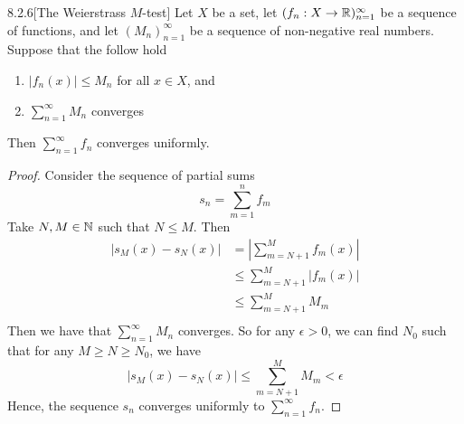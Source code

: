 \documentclass[openany]{report}
\begin{document}
\begin{manualtheorem}{8.2.6}[The Weierstrass $M$-test]
    Let $X$ be a set, let $(f_n: X \rightarrow \mathbb{R})_{n=1}^\infty$ be a sequence of functions, and let $(M_n)_{n=1}^\infty$ be a sequence of non-negative real numbers. Suppose that the follow hold
    \begin{enumerate}[label=(\roman*)]
        \item $|f_n(x)| \leq M_n$ for all $x \in X$, and 
        \item $\sum\limits_{n=1}^\infty M_n$ converges 
    \end{enumerate}
    Then $\sum\limits_{n=1}^\infty f_n$ converges uniformly. 
\end{manualtheorem}

\begin{proof}
    Consider the sequence of partial sums 
    \[s_n = \sum_{m=1}^n f_m\]
    Take $N, M \in \mathbb{N}$ such that $N \leq M$. Then
    \begin{align*}
        |s_{M}(x) - s_{N}(x)| &= \left|\sum_{m = N+1}^{M} f_m(x)\right|\\
        &\leq \sum_{m = N+1}^{M} |f_m(x)|\\
        &\leq \sum_{m=N+1}^{M} M_m\\
    \end{align*}
    Then we have that $\sum\limits_{n=1}^\infty M_n$ converges. So for any $\epsilon > 0$, we can find $N_0$ such that for any $M \geq N \geq N_0$, we have 
    \[|s_M (x) - s_N(x)| \leq \sum_{m = N+1}^M M_m < \epsilon\]
    Hence, the sequence $s_n$ converges uniformly to $\sum\limits_{n=1}^\infty f_n$.
\end{proof}
\end{document}
